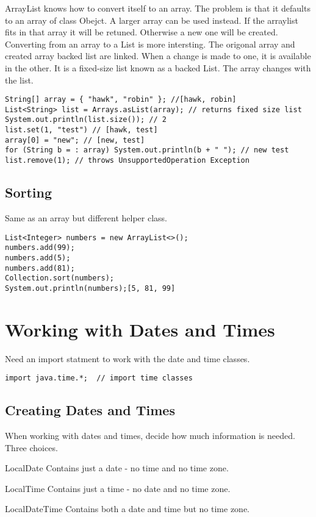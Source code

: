 \documentclass[a4paper]{report}   %
\begin{document}
ArrayList knows how to convert itself to an array. The problem is that it defaults to an array of class Obejct. A larger array can be used instead. If the arraylist fits in that array it will be retuned. Otherwise a new one will be created.\\

Converting from an array to a List is more intersting. The origonal array and created array backed list are linked. When a change is made to one, it is available in the other. It is a fixed-size list known as a backed List. The array changes with the list.

\begin{lstlisting}
String[] array = { "hawk", "robin" }; //[hawk, robin]
List<String> list = Arrays.asList(array); // returns fixed size list
System.out.println(list.size()); // 2
list.set(1, "test") // [hawk, test]
array[0] = "new"; // [new, test]
for (String b = : array) System.out.println(b + " "); // new test
list.remove(1); // throws UnsupportedOperation Exception
\end{lstlisting}

\subsection{Sorting}

Same as an array but different helper class.

\begin{lstlisting}
List<Integer> numbers = new ArrayList<>();
numbers.add(99);
numbers.add(5);
numbers.add(81);
Collection.sort(numbers);
System.out.println(numbers);[5, 81, 99]
\end{lstlisting}


\section{Working with Dates and Times}

Need an import statment to work with the date and time classes.

\begin{lstlisting}
import java.time.*;  // import time classes
\end{lstlisting}

\subsection{Creating Dates and Times}

When working with dates and times, decide how much information is needed. Three choices.
\begin{list}{•}{•}
\item LocalDate Contains just a date - no time and no time zone.
\item LocalTime Contains just a time - no date and no time zone.
\item LocalDateTime Contains both a date and time but no time zone. 
\end{list}
\end{document}
